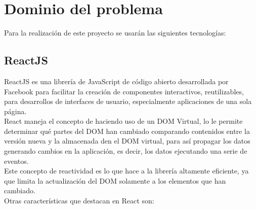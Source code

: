 \section{Dominio del problema}

    Para la realización de este proyecto se usarán las siguientes tecnologías:

    \subsection{ReactJS}

        ReactJS es una librería de JavaScript de código abierto desarrollada por Facebook para facilitar la creación de componentes interactivos, reutilizables, para desarrollos de interfaces de usuario, especialmente aplicaciones de una sola página.\\

        React maneja el concepto de  haciendo uso de un DOM Virtual, lo le permite determinar qué partes del DOM han cambiado comparando contenidos entre la versión nueva y la almacenada den el DOM virtual, para así propagar los datos generando cambios en la aplicación, es decir, los datos  ejecutando una serie de eventos.\\

        Este concepto de reactividad es lo que hace a la librería altamente eficiente, ya que limita la actualización del DOM solamente a los elementos que han cambiado.\\

        Otras características que destacan en React son:\\

